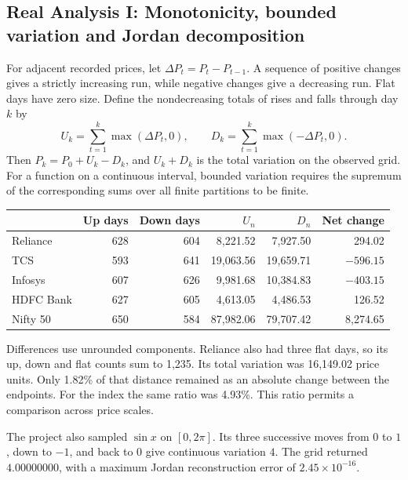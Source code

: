 \documentclass[12pt,a4paper]{article}
\begin{document}
\subsection{Real Analysis I: Monotonicity, bounded variation and Jordan decomposition}
For adjacent recorded prices, let $\Delta P_t=P_t-P_{t-1}$. A sequence of positive changes gives a strictly increasing run, while negative changes give a decreasing run. Flat days have zero size. Define the nondecreasing totals of rises and falls through day $k$ by
\[
 U_k=\sum_{t=1}^k\max(\Delta P_t,0),\qquad
 D_k=\sum_{t=1}^k\max(-\Delta P_t,0).
\]
Then $P_k=P_0+U_k-D_k$, and $U_k+D_k$ is the total variation on the observed grid. For a function on a continuous interval, bounded variation requires the supremum of the corresponding sums over all finite partitions to be finite.
\begin{center}\small\begin{tabular}{lrrrrr}\toprule
& Up days & Down days & $U_n$ & $D_n$ & Net change\\\midrule
Reliance &628&604&8,221.52&7,927.50&294.02\\
TCS &593&641&19,063.56&19,659.71&$-596.15$\\
Infosys &607&626&9,981.68&10,384.83&$-403.15$\\
HDFC Bank &627&605&4,613.05&4,486.53&126.52\\
Nifty 50 &650&584&87,982.06&79,707.42&8,274.65\\\bottomrule\end{tabular}\par\nopagebreak{}\end{center}
Differences use unrounded components. Reliance also had three flat days, so its up, down and flat counts sum to 1,235. Its total variation was 16,149.02 price units. Only 1.82\% of that distance remained as an absolute change between the endpoints. For the index the same ratio was 4.93\%. This ratio permits a comparison across price scales.
 
The project also sampled $\sin x$ on $[0,2\pi]$. Its three successive moves from $0$ to $1$, down to $-1$, and back to $0$ give continuous variation $4$. The grid returned $4.00000000$, with a maximum Jordan reconstruction error of $2.45\times10^{-16}$.
\clearpage
\end{document}
